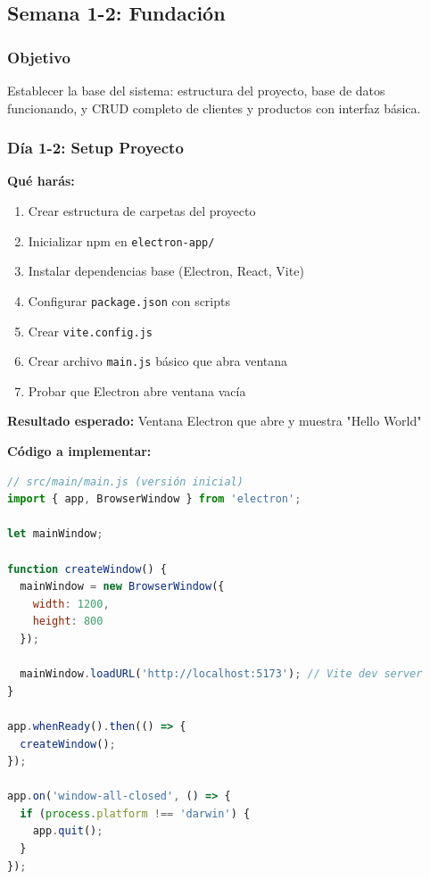 \documentclass[11pt,a4paper]{article}
\begin{document}
\subsection{Semana 1-2: Fundación}

\subsubsection{Objetivo}
Establecer la base del sistema: estructura del proyecto, base de datos funcionando, y CRUD completo de clientes y productos con interfaz básica.

\subsubsection{Día 1-2: Setup Proyecto}

\textbf{Qué harás:}
\begin{enumerate}
    \item Crear estructura de carpetas del proyecto
    \item Inicializar npm en \texttt{electron-app/}
    \item Instalar dependencias base (Electron, React, Vite)
    \item Configurar \texttt{package.json} con scripts
    \item Crear \texttt{vite.config.js}
    \item Crear archivo \texttt{main.js} básico que abra ventana
    \item Probar que Electron abre ventana vacía
\end{enumerate}

\textbf{Resultado esperado:} Ventana Electron que abre y muestra "Hello World"

\textbf{Código a implementar:}
\begin{lstlisting}[language=JavaScript]
// src/main/main.js (versión inicial)
import { app, BrowserWindow } from 'electron';

let mainWindow;

function createWindow() {
  mainWindow = new BrowserWindow({
    width: 1200,
    height: 800
  });
  
  mainWindow.loadURL('http://localhost:5173'); // Vite dev server
}

app.whenReady().then(() => {
  createWindow();
});

app.on('window-all-closed', () => {
  if (process.platform !== 'darwin') {
    app.quit();
  }
});
\end{lstlisting}
\end{document}

